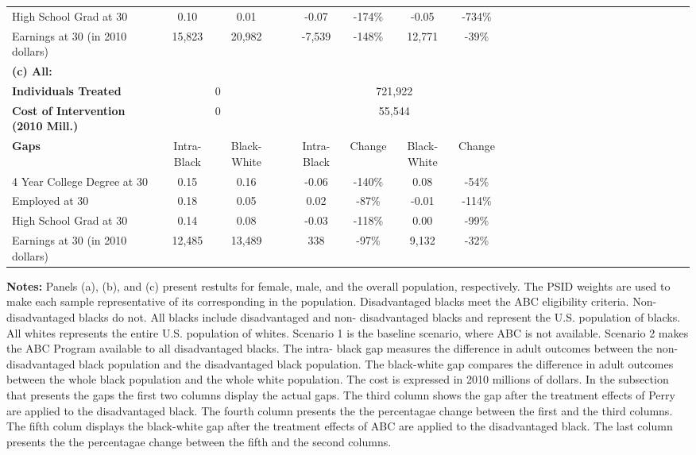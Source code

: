 \begin{table}[htbp]
\begin{center}
\begin{tabular}{lcccccccccccccccccccccccc}
 \\[0.2cm]  
High School Grad at 30 &        0.10&        0.01&&       -0.07&        -174\% &       -0.05&        -734\% &
 \\[0.2cm]  
Earnings at 30 (in 2010 dollars) &      15,823&      20,982&&      -7,539&        -148\% &      12,771&         -39\% &
 \\[0.2cm]  
\hline
 \textbf{(c) All:} & \multicolumn{2}{c}{}   &  &\multicolumn{4}{c}{}   \\[0.02cm] 
\textbf{Individuals Treated} &\multicolumn{2}{c}{ 0 } &
 &\multicolumn{4}{c}{     721,922} &
 \\[0.2cm]  
\textbf{Cost of Intervention (2010 Mill.)} &\multicolumn{2}{c}{ 0 } &
 &\multicolumn{4}{c}{      55,544} &
 \\[0.2cm]  
\textbf{Gaps}&Intra-Black &Black-White & &Intra-Black &Change &Black-White &Change  \\[0.02cm] 
\hline
4 Year College Degree at 30 &        0.15&        0.16&&       -0.06&        -140\% &        0.08&         -54\% &
 \\[0.2cm]  
Employed at 30 &        0.18&        0.05&&        0.02&         -87\% &       -0.01&        -114\% &
 \\[0.2cm]  
High School Grad at 30 &        0.14&        0.08&&       -0.03&        -118\% &        0.00&         -99\% &
 \\[0.2cm]  
Earnings at 30 (in 2010 dollars) &      12,485&      13,489&&         338&         -97\% &       9,132&         -32\% &
 \\[0.2cm]  
  \hline \hline    \end{tabular}
 \end{center} 
       {\scriptsize  
       {\raggedright 
{\bfseries Notes:} Panels (a), (b), and (c) present restults for female, male, and the overall population, respectively. The PSID weights are used to make each sample representative of its corresponding in the population. Disadvantaged blacks meet the  ABC eligibility criteria. Non-disadvantaged blacks do  not. All blacks include disadvantaged and non- disadvantaged blacks and represent the U.S. population of blacks. All  whites represents the entire U.S. population of whites.  Scenario 1 is the baseline scenario, where ABC is not available. Scenario 2  makes the ABC Program available to all disadvantaged blacks. The intra- black gap measures the difference in adult outcomes between the non- disadvantaged black population and the disadvantaged black population.  The black-white gap compares the difference in adult outcomes between the  whole black population and the whole white population. The cost is expressed in 2010 millions of dollars. In the subsection that presents the gaps the first two columns display the actual gaps. The third column shows the gap after the treatment effects of Perry are applied to the disadvantaged black. The fourth column presents the the percentagae change between the first and the third columns. The fifth colum displays the black-white gap after the treatment effects of ABC are applied to the disadvantaged black.  The last column presents the the percentagae change between the fifth and the second columns.} } 
 \end{table}
